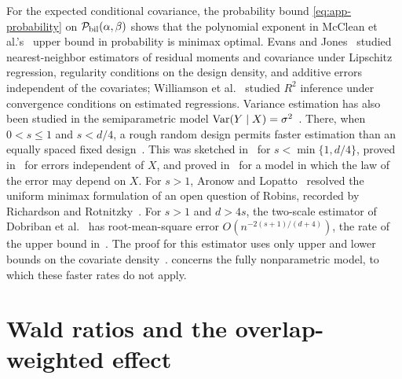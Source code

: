 For the expected conditional covariance, the probability bound
\eqref{eq:app-probability} on $\mathcal P_{\rm bil}(\alpha,\beta)$ shows that
the polynomial exponent in McClean et al.'s~\cite{mcclean} upper bound
in probability is minimax optimal. Evans and Jones~\cite[Section~1(a)
and Section~2]{evansjones} studied nearest-neighbor estimators of
residual moments and covariance under Lipschitz regression, regularity
conditions on the design density, and additive errors independent of
the covariates; Williamson et
al.~\cite[Section~2.3, Example~1, and Section~3, Theorems~1--2]{williamson}
studied $R^2$ inference under convergence conditions on estimated
regressions. Variance estimation has also been studied in the
semiparametric model $\operatorname{Var}(Y\mid X)=\sigma^2$~\cite{hoif2008,shen}.
There, when $0<s\le1$ and $s<d/4$, a rough random design permits faster
estimation than an equally spaced fixed
design~\cite{wangvariance,caivariance}. This was sketched
in~\cite[Section~4, pp.~382--383]{hoif2008} for $s<\min\{1,d/4\}$,
proved in~\cite{shen} for errors independent of $X$, and proved
in~\cite[Theorem~1.3]{aronowlopatto} for a model in which the law of the
error may depend on $X$. For $s>1$, Aronow and
Lopatto~\cite{aronowlopatto} resolved the uniform minimax formulation of
an open question of Robins, recorded by Richardson and
Rotnitzky~\cite[Section~6]{richardsonrotnitzky}. For $s>1$ and $d>4s$,
the two-scale estimator of Dobriban et
al.~\cite[Section~3.3, Proposition~3.4]{dobriban2026twoscale} has
root-mean-square error $O(n^{-2(s+1)/(d+4)})$, the rate of the upper bound
in~\cite[Theorem~1.1]{aronowlopatto}. The proof for this estimator uses
only upper and lower bounds on the covariate
density~\cite[Appendix~A.5]{dobriban2026twoscale}.
 concerns the fully nonparametric
model, to which these faster rates do not apply.

\section{Wald ratios and the overlap-weighted effect}\label{sec:further-applications}

